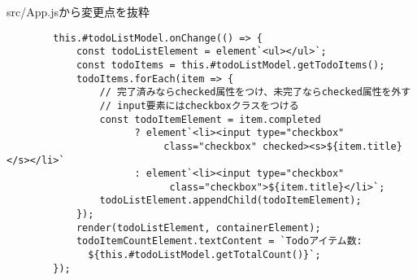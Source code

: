 \begin{listtitle}
src/App.jsから変更点を抜粋
\end{listtitle}
\begin{lstlisting}
        this.#todoListModel.onChange(() => {
            const todoListElement = element`<ul></ul>`;
            const todoItems = this.#todoListModel.getTodoItems();
            todoItems.forEach(item => {
                // 完了済みならchecked属性をつけ、未完了ならchecked属性を外す
                // input要素にはcheckboxクラスをつける
                const todoItemElement = item.completed
                      ? element`<li><input type="checkbox"
                           class="checkbox" checked><s>${item.title}</s></li>`
                      : element`<li><input type="checkbox"
                            class="checkbox">${item.title}</li>`;
                todoListElement.appendChild(todoItemElement);
            });
            render(todoListElement, containerElement);
            todoItemCountElement.textContent = `Todoアイテム数:
              ${this.#todoListModel.getTotalCount()}`;
        });
\end{lstlisting}
\listend
